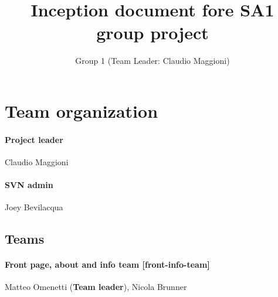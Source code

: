\documentclass[hidelinks,12pt,a4paper,numbers=enddot]{scrartcl}
\title{Inception document fore SA1 group project}
\author{Group 1 (Team Leader: Claudio Maggioni)}
\begin{document}
\maketitle
\tableofcontents
\newpage

\section{Team organization}\label{team-organization}

\paragraph{Project leader}
Claudio Maggioni

\paragraph{SVN admin}
Joey Bevilacqua

\subsection{Teams}

\paragraph{Front page, about and info team {[}front-info-team{]}}
Matteo Omenetti (\textbf{Team leader}), Nicola Brunner
\end{document}
